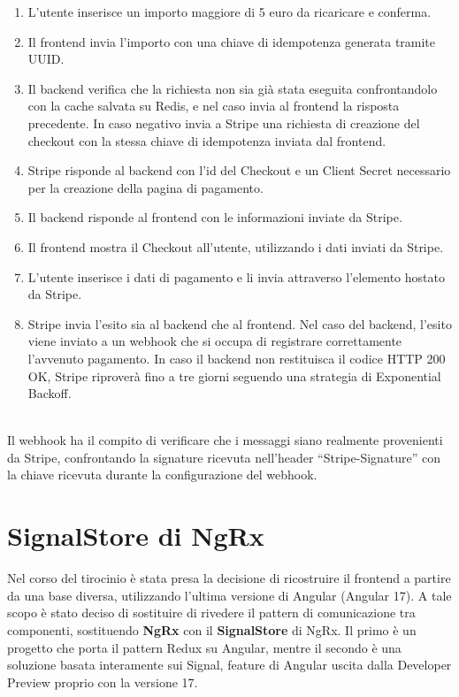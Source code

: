 \begin{enumerate}
  \item L'utente inserisce un importo maggiore di 5 euro da ricaricare e conferma.
  \item Il frontend invia l'importo con una chiave di idempotenza generata tramite UUID.
  \item Il backend verifica che la richiesta non sia gi\`a stata eseguita confrontandolo con la cache salvata su Redis, e nel caso invia al frontend la risposta precedente. In caso negativo invia a Stripe una richiesta di
    creazione del checkout con la stessa chiave di idempotenza inviata dal frontend.
  \item Stripe risponde al backend con l'id del Checkout e un Client Secret necessario per la creazione della pagina di pagamento.
  \item Il backend risponde al frontend con le informazioni inviate da Stripe.
  \item Il frontend mostra il Checkout all'utente, utilizzando i dati inviati da Stripe.
  \item L'utente inserisce i dati di pagamento e li invia attraverso l'elemento hostato da Stripe.
  \item Stripe invia l'esito sia al backend che al frontend. Nel caso del backend, l'esito viene inviato a un webhook che si occupa di registrare correttamente l'avvenuto
    pagamento. In caso il backend non restituisca il codice HTTP 200 OK, Stripe riprover\`a fino a tre giorni seguendo una strategia di Exponential Backoff.
\end{enumerate}
\textbf{}\\
Il webhook ha il compito di verificare che i messaggi siano realmente provenienti da Stripe, confrontando la signature ricevuta nell'header ``Stripe-Signature'' con la
chiave ricevuta durante la configurazione del webhook.

\section{SignalStore di NgRx}
Nel corso del tirocinio \`e stata presa la decisione di ricostruire il frontend a partire da una base diversa, utilizzando l'ultima versione di Angular (Angular 17).
A tale scopo \`e stato deciso di sostituire di rivedere il pattern di comunicazione tra componenti, sostituendo \textbf{NgRx} con il \textbf{SignalStore} di NgRx.
Il primo \`e un progetto che porta il pattern Redux su Angular, mentre il secondo \`e una soluzione basata interamente sui Signal, feature di Angular uscita dalla
Developer Preview proprio con la versione 17.

